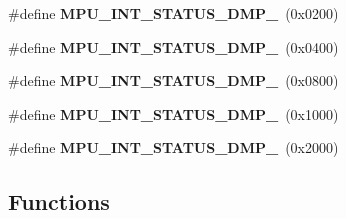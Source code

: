 \begin{DoxyCompactItemize}
\item 
\#define \textbf{ M\+P\+U\+\_\+\+I\+N\+T\+\_\+\+S\+T\+A\+T\+U\+S\+\_\+\+D\+M\+P\+\_}~(0x0200)
\item 
\#define \textbf{ M\+P\+U\+\_\+\+I\+N\+T\+\_\+\+S\+T\+A\+T\+U\+S\+\_\+\+D\+M\+P\+\_}~(0x0400)
\item 
\#define \textbf{ M\+P\+U\+\_\+\+I\+N\+T\+\_\+\+S\+T\+A\+T\+U\+S\+\_\+\+D\+M\+P\+\_}~(0x0800)
\item 
\#define \textbf{ M\+P\+U\+\_\+\+I\+N\+T\+\_\+\+S\+T\+A\+T\+U\+S\+\_\+\+D\+M\+P\+\_}~(0x1000)
\item 
\#define \textbf{ M\+P\+U\+\_\+\+I\+N\+T\+\_\+\+S\+T\+A\+T\+U\+S\+\_\+\+D\+M\+P\+\_}~(0x2000)
\end{DoxyCompactItemize}
\subsection*{Functions}

